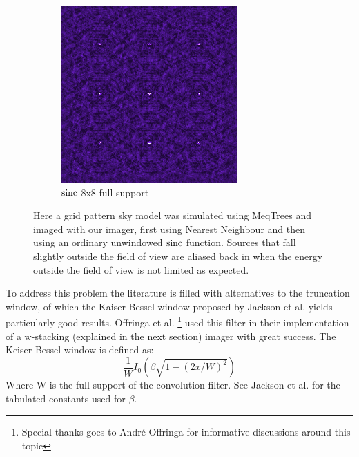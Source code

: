 \begin{figure}[h]
\begin{mdframed}
\begin{subfigure}[b]{0.35\textwidth}
      \includegraphics[width=\textwidth]{images/ratt_aa_kernel_demo_larger_support.png}
      \caption{$\operatorname*{sinc}$ 8x8 full support}
    \end{subfigure}
    \caption[Alias reduction]{Here a grid pattern sky model was simulated using MeqTrees \cite{noordam2010meqtrees} and imaged with our imager, first 
    using Nearest Neighbour and then using an ordinary unwindowed $\operatorname*{sinc}$ function. Sources that fall slightly outside the field of view are 
    aliased back in when the energy outside the field of view is not limited as expected.}
    \label{fig_aliasing_nn_vs_sinc}
  \end{mdframed}
 \end{figure}
 
 To address this problem the literature is filled with alternatives to the truncation window, of which 
 the Kaiser-Bessel window proposed by Jackson et al. \cite{jackson1991selection} yields particularly good results. 
 Offringa et al. \cite{offringa2014wsclean}\footnote{Special thanks goes to Andr\'e Offringa for informative discussions around this topic} used 
 this filter in their implementation of a w-stacking (explained in the next section) imager with great success. The Keiser-Bessel window is defined as:
 \begin{equation}
  \frac{1}{W}I_0(\beta\sqrt{1-(2x/W)^2})
 \end{equation}
 Where W is the full support of the convolution filter. See Jackson et al.\cite{jackson1991selection} for the tabulated constants used 
 for $\beta$.

